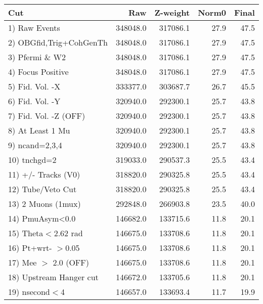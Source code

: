  \begin{table}[h!]\centering
 \begin{tabular}{||l||r|r|r|r||}
 \hline
 \hline
 Cut & Raw & Z-weight & Norm0 & Final \\
 \hline
  1) Raw Events           &    348048.0 &    317086.1 &        27.9 &        47.5 \\
  2) OBGfid,Trig+CohGenTh &    348048.0 &    317086.1 &        27.9 &        47.5 \\
  3) Pfermi \& W2         &    348048.0 &    317086.1 &        27.9 &        47.5 \\
  4) Focus Positive       &    348048.0 &    317086.1 &        27.9 &        47.5 \\
  5) Fid. Vol. -X         &    333377.0 &    303687.7 &        26.7 &        45.5 \\
  6) Fid. Vol. -Y         &    320940.0 &    292300.1 &        25.7 &        43.8 \\
  7) Fid. Vol. -Z (OFF)   &    320940.0 &    292300.1 &        25.7 &        43.8 \\
  8) At Least 1 Mu        &    320940.0 &    292300.1 &        25.7 &        43.8 \\
  9) ncand=2,3,4          &    320940.0 &    292300.1 &        25.7 &        43.8 \\
 10) tnchgd=2             &    319033.0 &    290537.3 &        25.5 &        43.4 \\
 11) +/- Tracks (V0)      &    318820.0 &    290325.8 &        25.5 &        43.4 \\
 12) Tube/Veto Cut        &    318820.0 &    290325.8 &        25.5 &        43.4 \\
 13) 2 Muons (1mux)       &    292848.0 &    266903.8 &        23.5 &        40.0 \\
 14) PmuAsym<0.0          &    146682.0 &    133715.6 &        11.8 &        20.1 \\
 15) Theta$<$2.62 rad     &    146675.0 &    133708.6 &        11.8 &        20.1 \\
 16) Pt+wrt- $>$0.05      &    146675.0 &    133708.6 &        11.8 &        20.1 \\
 17) Mee $>$ 2.0  (OFF)   &    146675.0 &    133708.6 &        11.8 &        20.1 \\
 18) Upstream Hanger cut  &    146672.0 &    133705.6 &        11.8 &        20.1 \\
 19) nsecond$<$4          &    146657.0 &    133693.4 &        11.7 &        19.9 \\

\end{tabular}
\end{table}
